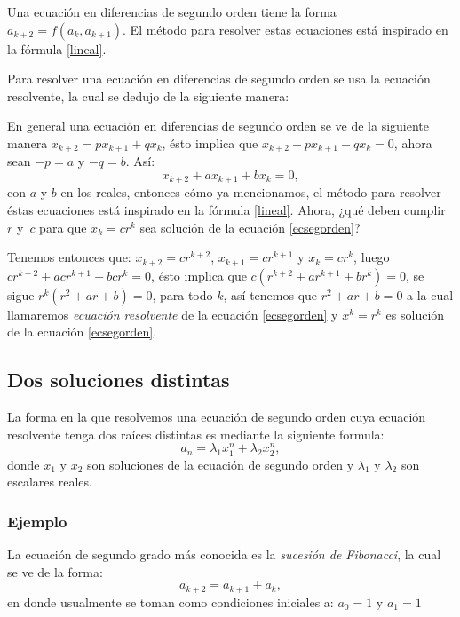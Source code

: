 \documentclass{article}
\begin{document}
Una ecuación en diferencias de segundo orden tiene la forma $a_{k+2}=f(a_k,a_{k+1})$.
El método para resolver estas ecuaciones está inspirado en la fórmula \ref{lineal}.

Para resolver una ecuación en diferencias de segundo orden se usa la
ecuación resolvente, la cual se dedujo de la siguiente manera:

En general una ecuación en diferencias de segundo orden se ve de la
siguiente manera $x_{k+2}=px_{k+1}+qx_{k}$, ésto implica que
$x_{k+2}-px_{k+1}-qx_{k}=0$, ahora sean $-p=a$ y $-q=b$. Así:
\begin{equation}
  \label{ecsegorden}
  x_{k+2}+ax_{k+1}+bx_{k}=0,
\end{equation}
con $a$ y $b$ en los reales, entonces cómo ya mencionamos, el método
para resolver éstas ecuaciones está inspirado en la fórmula
\ref{lineal}. Ahora, ¿qué deben cumplir $r$ y~$c$ para que $x_k=cr^k$
sea solución de la ecuación \eqref{ecsegorden}?

Tenemos entonces que: $x_{k+2}=cr^{k+2}$, $x_{k+1}=cr^{k+1}$ y
$x_{k}=cr^{k}$, luego $cr^{k+2}+acr^{k+1}+bcr^k=0$, ésto implica que
$c(r^{k+2}+ar^{k+1}+br^k)=0$, se sigue $r^k(r^2+ar+b)=0$, para todo
$k$, así tenemos que $r^2+ar+b=0$ a la cual llamaremos
\textit{ecuación resolvente} de la ecuación \eqref{ecsegorden} y
$x^k=r^k$ es solución de la ecuación \eqref{ecsegorden}.



\subsection{Dos soluciones distintas}
\label{sec:distintas}
La forma en la que resolvemos una ecuación de segundo orden cuya
ecuación resolvente tenga dos raíces distintas es mediante la
siguiente formula:
\begin{equation}
 \label{raicesdistintas}
 a_n=\lambda_1x_1^n +\lambda_2x_2^n,
\end{equation}
donde $x_1$ y $x_2$ son soluciones de la ecuación de segundo orden y
$\lambda_1$ y $\lambda_2$ son escalares reales.
\subsubsection{Ejemplo}

La ecuación de segundo grado más conocida es la \textit{sucesión de
  Fibonacci}, la cual se ve de la forma:
\begin{equation}
  \label{eq:fibonacci}
a_{k+2}=a_{k+1}+a_{k},  
\end{equation}
en donde usualmente se toman como condiciones iniciales a: $a_{0}=1$ y $a_{1}=1$
\end{document}
